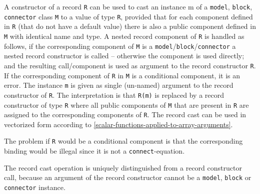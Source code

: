 A constructor of a record \lstinline!R! can be used to cast an instance m of a
\lstinline!model!, \lstinline!block!, \lstinline!connector! class \lstinline!M! to a value of type \lstinline!R!, provided that for
each component defined in \lstinline!R! (that do not have a default value) there is
also a public component defined in \lstinline!M! with identical name and type. A
nested record component of \lstinline!R! is handled as follows, if the corresponding
component of \lstinline!M! is a \lstinline!model!/\lstinline!block!/\lstinline!connector! a nested record constructor is
called -- otherwise the component is used directly; and the resulting
call/component is used as argument to the record constructor \lstinline!R!. If the
corresponding component of \lstinline!R! in \lstinline!M! is a conditional component, it is an
error. The instance \lstinline!m! is given as single (un-named)
argument to the record constructor of \lstinline!R!. The interpretation is that \lstinline!R(m)!
is replaced by a record constructor of type \lstinline!R! where all public
components of \lstinline!M! that are present in \lstinline!R! are assigned to the corresponding
components of \lstinline!R!. The record cast can be used in vectorized form
according to \cref{scalar-functions-applied-to-array-arguments}.

\begin{nonnormative}
The problem if \lstinline!R! would be a conditional component is that the corresponding binding would be illegal since it is not a \lstinline!connect!-equation.
\end{nonnormative}

\begin{nonnormative}
The record cast operation is uniquely distinguished from a record constructor call, because an argument of the record constructor cannot
be a \lstinline!model!, \lstinline!block! or \lstinline!connector! instance.
\end{nonnormative}


